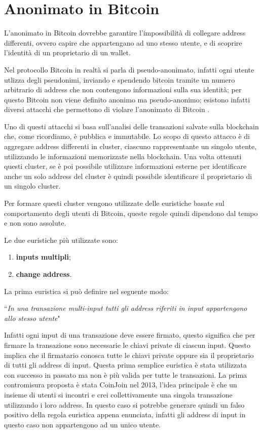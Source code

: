 \section{Anonimato in Bitcoin}\label{Anonimato}
L'anonimato in Bitcoin dovrebbe garantire l'impossibilità di collegare address differenti, ovvero capire che appartengano ad uno stesso utente, e di scoprire l'identità di un proprietario di un wallet.

Nel protocollo Bitcoin in realtà si parla di pseudo-anonimato, infatti ogni utente utlizza degli pseudonimi, inviando e spendendo bitcoin tramite un numero arbitrario di address che non contengono informazioni sulla sua identità; per questo Bitcoin non viene definito anonimo ma pseudo-anonimo; esistono infatti diversi attacchi che permettono di violare l'anonimato di Bitcoin \cite{de-anonimizzazione} \cite{de-anon2}.

Uno di questi attacchi si basa sull'analisi delle transazioni salvate sulla blockchain che, come ricordiamo, è pubblica e immutabile. Lo scopo di questo attacco è di aggregare address differenti in cluster, ciascuno rappresentante un singolo utente, utilizzando le informazioni memorizzate nella blockchain. Una volta ottenuti questi cluster, se è poi possibile utilizzare informazioni esterne per identificare anche un solo address del cluster è quindi possibile identificare il proprietario di un singolo cluster. 

Per formare questi cluster vengono utilizzate delle euristiche basate sul comportamento degli utenti di Bitcoin, queste regole quindi dipendono dal tempo e non sono assolute. 

Le due euristiche più utilizzate sono:
\begin{enumerate}
    \item \textbf{inputs multipli};
    \item \textbf{change address}.
\end{enumerate}

La prima euristica si può definire nel seguente modo:
\begin{center}
    ``\textit{In una transazione multi-input tutti gli address riferiti in input appartengono allo stesso utente}"
\end{center}

Infatti ogni input di una transazione deve essere firmato, questo significa che per firmare la transazione sono necessarie le chiavi private di ciascun input. Questo implica che il firmatario conosca tutte le chiavi private oppure sia il proprietario di tutti gli address di input. Questa prima semplice euristica è stata utilizzata con successo in passato ma non è più valida per tutte le transazioni. La prima contromisura proposta è stata CoinJoin \cite{coinjoin} nel 2013, l'idea principale è che un insieme di utenti si incontri e crei collettivamente una singola transazione utilizzando i loro address. In questo caso si potrebbe generare quindi un falso positivo della regola euristica appena enunciata, infatti gli address di input in questo caso non appartengono ad un unico utente.

